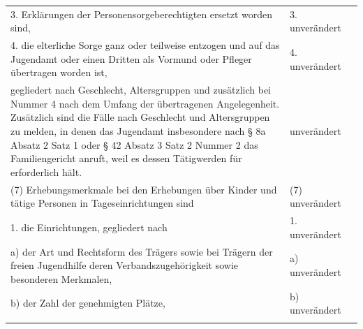 \documentclass[10pt,a4paper,landscape]{article}
\begin{document}
\begin{longtable}{|L{8.2cm}|L{8.2cm}|L{8.2cm}|}
\hhline{|---|}
3.   \newline Erklärungen der  \newline Personensorgeberechtigten ersetzt worden  \newline sind, & 3. unverändert &  \\
\hhline{|---|}
4.  \newline die elterliche Sorge ganz oder teilweise  \newline entzogen und auf das Jugendamt oder  \newline einen Dritten als Vormund oder Pfleger  \newline übertragen worden ist, & 4. unverändert &  \\
\hhline{|---|}
gegliedert nach Geschlecht, Altersgruppen  \newline und zusätzlich bei Nummer 4 nach dem  \newline Umfang der übertragenen Angelegenheit.  \newline Zusätzlich sind die Fälle nach Geschlecht  \newline und Altersgruppen zu melden, in denen  \newline das Jugendamt insbesondere nach \S{} 8a  \newline Absatz 2 Satz 1 oder \S{} 42 Absatz 3 Satz 2  \newline Nummer 2 das Familiengericht anruft, weil  \newline es dessen Tätigwerden für erforderlich hält. & unverändert &  \\
\hhline{|---|}
(7) Erhebungsmerkmale bei den  \newline Erhebungen über Kinder und tätige  \newline Personen in Tageseinrichtungen sind & (7) unverändert &  \\
\hhline{|---|}
1.   \newline die Einrichtungen, gegliedert nach & 1. unverändert &  \\
\hhline{|---|}
a)   \newline der Art und Rechtsform des Trägers sowie  \newline bei Trägern der freien Jugendhilfe deren  \newline Verbandszugehörigkeit sowie besonderen  \newline Merkmalen, & a) unverändert &  \\
\hhline{|---|}
b)   \newline der Zahl der genehmigten Plätze, & b) unverändert &  \\
\hhline{|---|}

\end{longtable}
\end{document}

